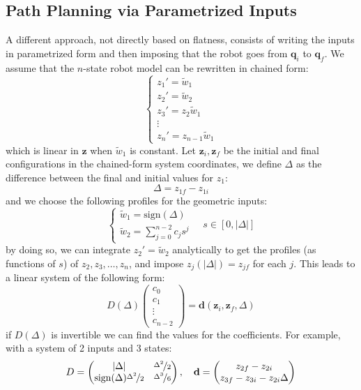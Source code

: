 \documentclass[10pt, a4paper]{report}
\newcommand{\q}{{\mathbf q}}
\begin{document}
\subsection{Path Planning via Parametrized Inputs}
A different approach, not directly based on flatness,
consists of writing the inputs in parametrized form and
then imposing that the robot goes from $\q_i$ to $\q_f$. We assume that the $n$-state robot model can be rewritten in chained form:\begin{equation}\label{chained_form}\begin{cases}
    z_1'=\tilde w_1\\
    z_2'=\tilde w_2\\
    z_3'=z_2\tilde w_1\\\vdots\\
    z_n'=z_{n-1}\tilde w_1
\end{cases}\end{equation}
which is linear in $\mathbf z$ when $\tilde w_1$ is constant. Let $\mathbf z_i,\mathbf z_f$ be the initial and final configurations in the chained-form system coordinates, we define $\Delta$ as the difference between the final and initial values for $z_1$:\begin{equation}
    \Delta=z_{1f}-z_{1i}
\end{equation}
and we choose the following profiles for the geometric inputs:\begin{equation}
    \begin{cases}
        \tilde w_1=\text{sign}(\Delta)\\ 
        \displaystyle\tilde w_2=\sum_{j=0}^{n-2}c_js^j 
    \end{cases}\quad s\in[0,|\Delta|]
\end{equation}
by doing so, we can integrate $z_2'=\tilde w_2$ analytically to get the profiles (as functions of $s$) of $z_2,z_3,\dots,z_n$, and impose $z_j(|\Delta|)=z_{jf}$ for each $j$. This leads to a linear system of the following form:\begin{equation}
    D(\Delta)\begin{pmatrix}
        c_0\\c_1\\\vdots\\ c_{n-2}
    \end{pmatrix}=\mathbf d(\mathbf z_i,\mathbf z_f,\Delta)
\end{equation}
if $D(\Delta)$ is invertible we can find the values for the coefficients. For example, with a system of 2 inputs and 3 states:\begin{equation}
    D=\begin{pmatrix}
        |\Delta|&\nicefrac{\Delta^2}{2}\\ 
        \text{sign}(\Delta)\nicefrac{\Delta^2}{2}&\nicefrac{\Delta^3}{6}
    \end{pmatrix},\quad
    \mathbf d=\begin{pmatrix}
        z_{2f}-z_{2i}\\
        z_{3f}-z_{3i}-z_{2i}\Delta
    \end{pmatrix}
\end{equation}
\end{document}

